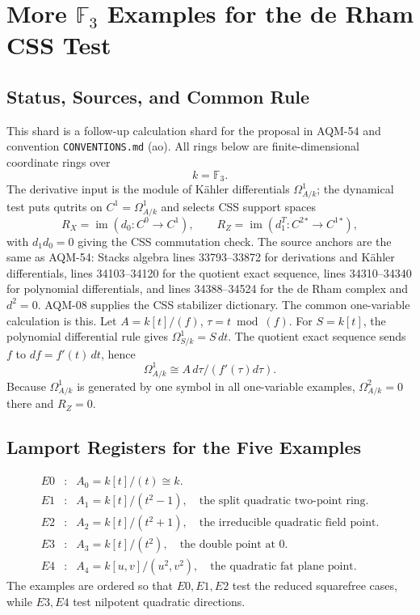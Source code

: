 \section{More \texorpdfstring{\(\mathbb F_3\)}{F3} Examples for the de Rham CSS Test}
\label{sec:derham-css-more-f3-examples}
\subsection{Status, Sources, and Common Rule}
This shard is a follow-up calculation shard for the proposal in
AQM-54 and convention \texttt{CONVENTIONS.md} (ao).  All rings below are
finite-dimensional coordinate rings over
\[
  k=\mathbb F_3.
\]
The derivative input is the module of K\"ahler differentials
\(\Omega^1_{A/k}\); the dynamical test puts qutrits on
\(C^1=\Omega^1_{A/k}\) and selects CSS support spaces
\[
  R_X=\operatorname{im}(d_0:C^0\to C^1),\qquad
  R_Z=\operatorname{im}(d_1^T:C^2{}^*\to C^1{}^*),
\]
with \(d_1d_0=0\) giving the CSS commutation check.  The source anchors are
the same as AQM-54: Stacks algebra lines 33793--33872 for derivations and
K\"ahler differentials, lines 34103--34120 for the quotient exact sequence,
lines 34310--34340 for polynomial differentials, and lines 34388--34524 for
the de Rham complex and \(d^2=0\).  AQM-08 supplies the CSS stabilizer
dictionary.
The common one-variable calculation is this.  Let
\(A=k[t]/(f)\), \(\tau=t\bmod(f)\).  For \(S=k[t]\), the polynomial
differential rule gives \(\Omega^1_{S/k}=S\,dt\).  The quotient exact
sequence sends \(f\) to \(df=f'(t)\,dt\), hence
\[
  \Omega^1_{A/k}\cong A\,d\tau/(f'(\tau)d\tau).
\]
Because \(\Omega^1_{A/k}\) is generated by one symbol in all one-variable
examples, \(\Omega^2_{A/k}=0\) there and \(R_Z=0\).
\subsection{Lamport Registers for the Five Examples}
\[
\begin{array}{rcl}
E0&:&A_0=k[t]/(t)\cong k.\\
E1&:&A_1=k[t]/(t^2-1),\quad\text{the split quadratic two-point ring.}\\
E2&:&A_2=k[t]/(t^2+1),\quad\text{the irreducible quadratic field point.}\\
E3&:&A_3=k[t]/(t^2),\quad\text{the double point at }0.\\
E4&:&A_4=k[u,v]/(u^2,v^2),\quad\text{the quadratic fat plane point.}
\end{array}
\]
The examples are ordered so that \(E0,E1,E2\) test the reduced squarefree
cases, while \(E3,E4\) test nilpotent quadratic directions.
